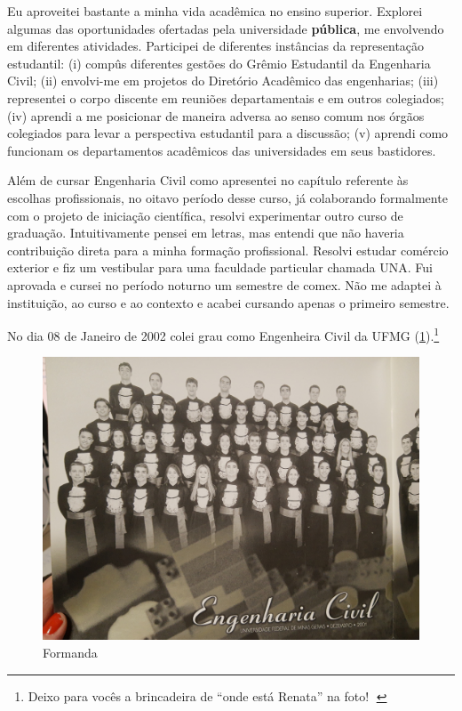 \documentclass[
]{book}
\begin{document}
Eu aproveitei bastante a minha vida acadêmica no ensino superior. Explorei algumas das oportunidades ofertadas pela universidade \textbf{pública}, me envolvendo em diferentes atividades. Participei de diferentes instâncias da representação estudantil: (i) compûs diferentes gestões do Grêmio Estudantil da Engenharia Civil; (ii) envolvi-me em projetos do Diretório Acadêmico das engenharias; (iii) representei o corpo discente em reuniões departamentais e em outros colegiados; (iv) aprendi a me posicionar de maneira adversa ao senso comum nos órgãos colegiados para levar a perspectiva estudantil para a discussão; (v) aprendi como funcionam os departamentos acadêmicos das universidades em seus bastidores.

Além de cursar Engenharia Civil como apresentei no capítulo referente às escolhas profissionais, no oitavo período desse curso, já colaborando formalmente com o projeto de iniciação científica, resolvi experimentar outro curso de graduação. Intuitivamente pensei em letras, mas entendi que não haveria contribuição direta para a minha formação profissional. Resolvi estudar comércio exterior e fiz um vestibular para uma faculdade particular chamada UNA. Fui aprovada e cursei no período noturno um semestre de comex. Não me adaptei à instituição, ao curso e ao contexto e acabei cursando apenas o primeiro semestre.

No dia 08 de Janeiro de 2002 colei grau como Engenheira Civil da UFMG (\ref{fig:forma}).\footnote{Deixo para vocês a brincadeira de ``onde está Renata'' na foto! 🤪}

\begin{figure}
\includegraphics[width=1\linewidth]{img/forma} \caption{Formanda}\label{fig:forma}
\end{figure}
\end{document}
